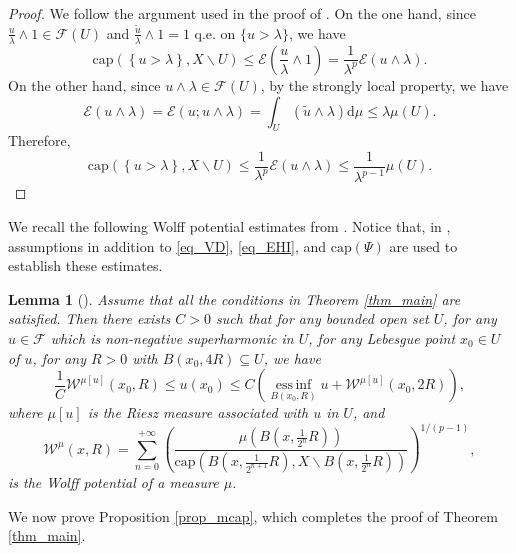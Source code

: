 \documentclass[11pt,a4paper]{article}
\numberwithin{equation}{section}
\newcommand{\einf}{\operatorname*{ess\,inf}}
\theoremstyle{plain}
\newtheorem{lemma}[theorem]{Lemma}
\theoremstyle{definition}
\begin{document}
\begin{proof}
We follow the argument used in the proof of \cite[LEMMA 3.9]{KM94Acta}. On the one hand, since $\frac{u}{\lambda}\wedge 1\in \mathcal{F}(U)$ and $\frac{\widetilde{u}}{\lambda}\wedge 1=1$ q.e. on $\{u>\lambda\}$, we have
$$\mathrm{cap}\left(\left\{u>\lambda\right\},X\backslash U\right)\le \mathcal{E}(\frac{u}{\lambda}\wedge 1)=\frac{1}{\lambda^p}\mathcal{E}(u\wedge \lambda).$$
On the other hand, since $u\wedge \lambda\in \mathcal{F}(U)$, by the strongly local property, we have
$$\mathcal{E}(u\wedge \lambda)=\mathcal{E}(u;u\wedge \lambda)=\int_U \left(\widetilde{u}\wedge \lambda\right) \mathrm{d}\mu\le \lambda\mu(U).$$
Therefore,
$$\mathrm{cap}\left(\left\{u>\lambda\right\},X\backslash U\right)\le \frac{1}{\lambda^p}\mathcal{E}(u\wedge \lambda)\le \frac{1}{\lambda^{p-1}}\mu(U).$$
\end{proof}

We recall the following Wolff potential estimates from \cite{Yan25d}. Notice that, in \cite{Yan25d}, assumptions in addition to \ref{eq_VD}, \ref{eq_EHI}, and \hyperlink{eq_cap}{$\text{cap}(\Psi)$} are used to establish these estimates.

\begin{lemma}[{\cite[Theorem 3.12]{Yan25d}}]\label{lem_Wolff}
Assume that all the conditions in Theorem \ref{thm_main} are satisfied. Then there exists $C>0$ such that for any bounded open set $U$, for any $u\in\mathcal{F}$ which is non-negative superharmonic in $U$, for any Lebesgue point $x_0\in U$ of $u$, for any $R>0$ with $B(x_0,4R)\subseteq U$, we have
\begin{equation*}
\frac{1}{C}\mathcal{W}^{\mu[u]}(x_0,R)\le u(x_0)\le C \left(\einf_{B(x_0,R)}u+\mathcal{W}^{\mu[u]}(x_0,2R)\right),
\end{equation*}
where $\mu[u]$ is the Riesz measure associated with $u$ in $U$, and
$$\mathcal{W}^\mu(x,R)=\sum_{n=0}^{+\infty} \left(\frac{\mu(B(x,\frac{1}{2^n}R))}{\mathrm{cap}(B(x,\frac{1}{2^{n+1}}R),X\backslash B(x,\frac{1}{2^n}R))}\right)^{{1}/{(p-1)}},$$
is the Wolff potential of a measure $\mu$.
\end{lemma}

We now prove Proposition \ref{prop_mcap}, which completes the proof of Theorem \ref{thm_main}.
\end{document}
